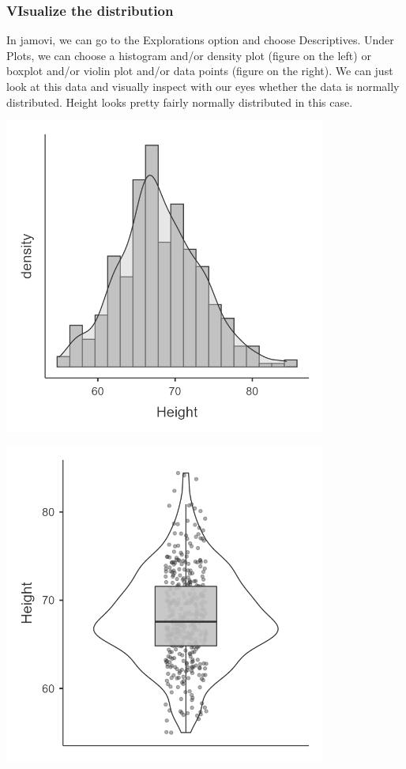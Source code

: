 \documentclass[
]{book}
\begin{document}
\hypertarget{visualize-the-distribution}{%
\subsubsection{VIsualize the distribution}\label{visualize-the-distribution}}

In jamovi, we can go to the Explorations option and choose Descriptives. Under Plots, we can choose a histogram and/or density plot (figure on the left) or boxplot and/or violin plot and/or data points (figure on the right). We can just look at this data and visually inspect with our eyes whether the data is normally distributed. Height looks pretty fairly normally distributed in this case.

\includegraphics[width=4.16667in,height=\textheight]{images/06-inferential/histogram.png}

\includegraphics[width=4.16667in,height=\textheight]{images/06-inferential/boxplot.png}
\end{document}
